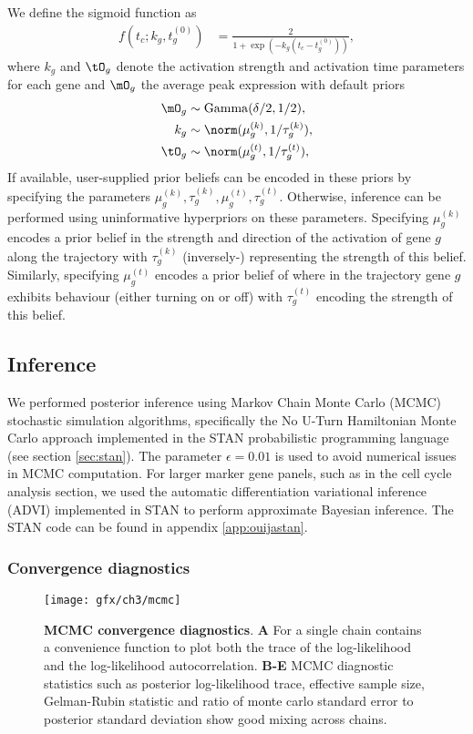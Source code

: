 We define the sigmoid function as
\begin{align}
	f(t_c;k_g,t^{(0)}_g) &= \frac{2}{1 + \exp\left(-k_g(t_c - t^{(0)}_g)\right)},
\end{align}
where $k_g$ and $\tO_g$ denote the activation strength and activation time parameters for each gene and $\mO_g$ the average peak expression
with default priors
\begin{align}
		\mO_g & \sim \mathrm{Gamma}(\delta / 2, 1 / 2), \\
		k_g & \sim \norm(\mu^{(k)}_g, 1 / \tau^{(k)}_g), \\
		\tO_g & \sim \norm(\mu^{(t)}_g, 1 / \tau^{(t)}_g),
\end{align}
If available, user-supplied prior beliefs can be encoded in these priors by specifying the parameters $\mu^{(k)}_g, \tau^{(k)}_g, \mu^{(t)}_g, \tau^{(t)}_g$. Otherwise, inference can be performed using uninformative hyperpriors on these parameters. Specifying $\mu^{(k)}_g$ encodes a prior belief in the strength and direction of the activation of gene $g$ along the trajectory with $\tau^{(k)}_g$ (inversely-) representing the strength of this belief. Similarly, specifying $\mu^{(t)}_g$ encodes a prior belief of where in the trajectory gene $g$ exhibits behaviour (either turning on or off) with $\tau^{(t)}_g$ encoding the strength of this belief.

\subsection{Inference}

We performed posterior inference using Markov Chain Monte Carlo (MCMC) stochastic simulation algorithms, specifically the No U-Turn Hamiltonian Monte Carlo approach \cite{Hoffman2014-pl} implemented in the STAN probabilistic programming language \cite{carpenter2015stan} (see section \ref{sec:stan}). The parameter $\epsilon = 0.01$ is used to avoid numerical issues in MCMC computation. For larger marker gene panels, such as in the cell cycle analysis section, we used the automatic differentiation variational inference (ADVI) implemented in STAN to perform approximate Bayesian inference. The STAN code can be found in appendix \ref{app:ouijastan}.


\subsubsection{Convergence diagnostics}

\begin{figure}
\centering
 \texttt{[image: gfx/ch3/mcmc]}
 \caption{\textbf{MCMC convergence diagnostics}. \textbf{A} For a single chain \sname contains a convenience function to plot both the trace of the log-likelihood and the log-likelihood autocorrelation. \textbf{B-E} MCMC diagnostic statistics such as posterior log-likelihood trace, effective sample size, Gelman-Rubin statistic and ratio of monte carlo standard error to posterior standard deviation show good mixing across chains.} \label{fig:mcmc}
 \end{figure}

